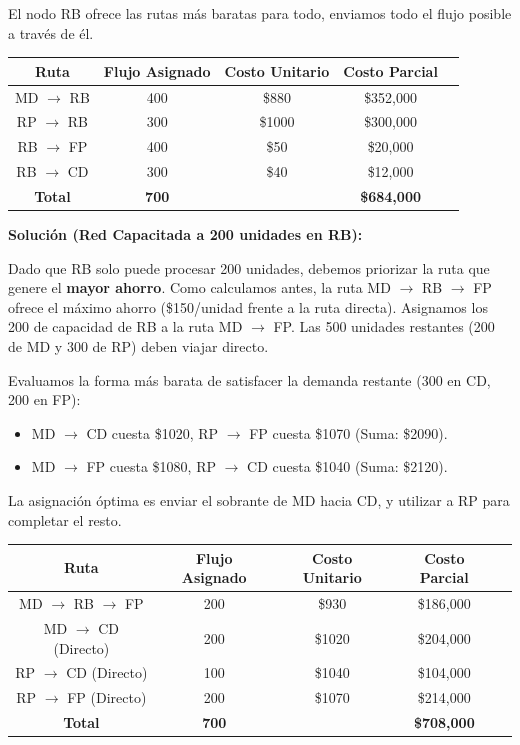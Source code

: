 \documentclass[10pt,a4paper]{article}
\begin{document}
El nodo RB ofrece las rutas más baratas para todo, 
enviamos todo el flujo posible a través de él.

\begin{table}[h!]
\centering
\begin{tabular}{ccccc}
\hline
\textbf{Ruta} & \textbf{Flujo Asignado} & \textbf{Costo Unitario} & \textbf{Costo Parcial} \\
\hline
MD $\to$ RB & 400 & \$880 & \$352,000 \\
RP $\to$ RB & 300 & \$1000 & \$300,000 \\
RB $\to$ FP & 400 & \$50 & \$20,000 \\
RB $\to$ CD & 300 & \$40 & \$12,000 \\
\hline
\textbf{Total} & \textbf{700} & & \textbf{\$684,000} \\
\hline
\end{tabular}
\end{table}

\textbf{Solución (Red Capacitada a 200 unidades en RB):}

Dado que RB solo puede procesar 200 unidades, debemos priorizar la ruta 
que genere el \textbf{mayor ahorro}. 
Como calculamos antes, la ruta MD $\to$ RB $\to$ FP 
ofrece el máximo ahorro 
(\$150/unidad frente a la ruta directa).
Asignamos los 200 de capacidad de RB a la ruta
 MD $\to$ FP. Las 500 unidades restantes 
 (200 de MD y 300 de RP) deben viajar directo. 

Evaluamos la forma más barata de satisfacer la demanda restante (300 en CD, 200 en FP):
\begin{itemize}
    \item MD $\to$ CD cuesta \$1020, RP $\to$ FP cuesta \$1070 (Suma: \$2090).
    \item MD $\to$ FP cuesta \$1080, RP $\to$ CD cuesta \$1040 (Suma: \$2120).
\end{itemize}
La asignación óptima es enviar el sobrante de MD hacia CD, y utilizar a RP para completar el resto.

\begin{table}[h!]
\centering
\begin{tabular}{ccccc}
\hline
\textbf{Ruta} & \textbf{Flujo Asignado} & \textbf{Costo Unitario} & \textbf{Costo Parcial} \\
\hline
MD $\to$ RB $\to$ FP & 200 & \$930 & \$186,000 \\
MD $\to$ CD (Directo) & 200 & \$1020 & \$204,000 \\
RP $\to$ CD (Directo) & 100 & \$1040 & \$104,000 \\
RP $\to$ FP (Directo) & 200 & \$1070 & \$214,000 \\
\hline
\textbf{Total} & \textbf{700} & & \textbf{\$708,000} \\
\hline
\end{tabular}
\end{table}
\end{document}
